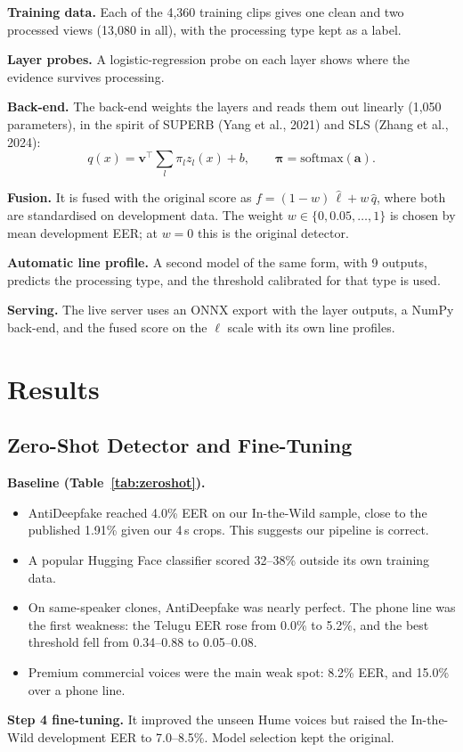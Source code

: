 \documentclass[10pt,a4paper,twocolumn]{article}
\newcommand{\llr}{\ell}
\begin{document}
\textbf{Training data.} Each of the 4,360 training clips gives one clean and two processed views (13,080 in all), with the processing type kept as a label.

\textbf{Layer probes.} A logistic-regression probe on each layer shows where the evidence survives processing.

\textbf{Back-end.} The back-end weights the layers and reads them out linearly (1,050 parameters), in the spirit of SUPERB (Yang et al., 2021) and SLS (Zhang et al., 2024):
\begin{equation}
q(x)=\mathbf{v}^{\top}\textstyle\sum_{l}\pi_l z_l(x)+b,\qquad \boldsymbol{\pi}=\mathrm{softmax}(\mathbf{a}).
\label{eq:backend}
\end{equation}

\textbf{Fusion.} It is fused with the original score as $f=(1-w)\,\hat\llr+w\,\hat q$, where both are standardised on development data. The weight $w\in\{0,0.05,\dots,1\}$ is chosen by mean development EER; at $w=0$ this is the original detector.

\textbf{Automatic line profile.} A second model of the same form, with 9 outputs, predicts the processing type, and the threshold calibrated for that type is used.

\textbf{Serving.} The live server uses an ONNX export with the layer outputs, a NumPy back-end, and the fused score on the $\llr$ scale with its own line profiles.

\section{Results}
\subsection{Zero-Shot Detector and Fine-Tuning}
\textbf{Baseline (Table~\ref{tab:zeroshot}).}
\begin{itemize}\setlength\itemsep{0pt}
\item AntiDeepfake reached 4.0\% EER on our In-the-Wild sample, close to the published 1.91\% given our 4\,s crops. This suggests our pipeline is correct.
\item A popular Hugging Face classifier scored 32--38\% outside its own training data.
\item On same-speaker clones, AntiDeepfake was nearly perfect. The phone line was the first weakness: the Telugu EER rose from 0.0\% to 5.2\%, and the best threshold fell from 0.34--0.88 to 0.05--0.08.
\item Premium commercial voices were the main weak spot: 8.2\% EER, and 15.0\% over a phone line.
\end{itemize}
\textbf{Step 4 fine-tuning.} It improved the unseen Hume voices but raised the In-the-Wild development EER to 7.0--8.5\%. Model selection kept the original.
\end{document}
